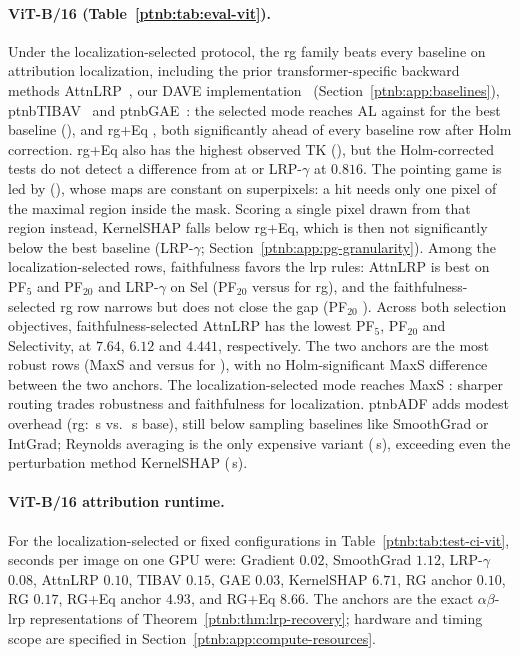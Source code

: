 \paragraph{ViT-B/16 (Table~\ref{ptnb:tab:eval-vit}).}
Under the localization-selected protocol, the \ac{rg} family beats every baseline on attribution
localization, including the prior transformer-specific backward methods
AttnLRP~\parencite{Achtibat2024AttnLRP}, our DAVE implementation~\parencite{Wrobel2024} (Section~\ref{ptnb:app:baselines}),
\ac{ptnbTIBAV}~\parencite{Chefer2021GenericAttention} and \ac{ptnbGAE}~\parencite{Chefer2021ICCV}: the selected mode
reaches AL \vitRGlocAL{} against \vitBestBaseAL{} for the best baseline (\vitBestBaseALname), and
\ac{rg}+Eq \vitRGEqlocAL{}, both significantly ahead of every baseline row after Holm correction.
\ac{rg}+Eq also has the highest observed TK (\vitRGEqlocTK{}), but the Holm-corrected tests do not detect a difference from \vitBestBaseTKname{}
at \vitBestBaseTK{} or LRP-$\gamma$ at $0.816$. The pointing game is led by \vitBestBasePGname{} (\vitBestBasePG{}), whose
maps are constant on superpixels: a hit needs only one pixel of the maximal region inside the mask.
Scoring a single pixel drawn from that region instead, KernelSHAP falls below \ac{rg}+Eq, which is
then not significantly below the best baseline (LRP-$\gamma$; Section~\ref{ptnb:app:pg-granularity}).
Among the localization-selected rows, faithfulness favors the \ac{lrp} rules: AttnLRP is best on PF$_5$ and PF$_{20}$ and LRP-$\gamma$ on
Sel (PF$_{20}$ \vitBestBasePFtwenty{} versus \vitRGlocPFtwenty{} for \ac{rg}), and the
faithfulness-selected \ac{rg} row narrows but does not close the gap (PF$_{20}$
\vitRGfaithPFtwenty{}). Across both selection objectives, faithfulness-selected AttnLRP has the lowest PF$_5$, PF$_{20}$ and Selectivity, at $7.64$, $6.12$ and $4.441$, respectively. The two anchors are the most robust rows (MaxS \vitRGanchorMaxS{} and
\vitRGEqanchorMaxS{} versus \vitBestBaseMaxS{} for \vitBestBaseMaxSname{}), with no Holm-significant MaxS difference between the two anchors. The
localization-selected mode reaches MaxS \vitRGlocMaxS{}: sharper routing trades robustness and
faithfulness for localization. \ac{ptnbADF} adds modest overhead (\ac{rg}: \vitRGlocTime\,s vs.\
\vitRGanchorTime\,s base), still below sampling baselines like SmoothGrad or IntGrad; Reynolds
averaging is the only expensive variant (\vitRGEqTime\,s), exceeding even the perturbation method
KernelSHAP (\vitSHAPTime\,s).

\paragraph{ViT-B/16 attribution runtime.} For the localization-selected or fixed configurations in Table~\ref{ptnb:tab:test-ci-vit}, seconds per image on one GPU were: Gradient $0.02$, SmoothGrad $1.12$, LRP-$\gamma$ $0.08$, AttnLRP $0.10$, TIBAV $0.15$, GAE $0.03$, KernelSHAP $6.71$, RG anchor $0.10$, RG $0.17$, RG+Eq anchor $4.93$, and RG+Eq $8.66$. The anchors are the exact $\alpha\beta$-\ac{lrp} representations of Theorem~\ref{ptnb:thm:lrp-recovery}; hardware and timing scope are specified in Section~\ref{ptnb:app:compute-resources}.

